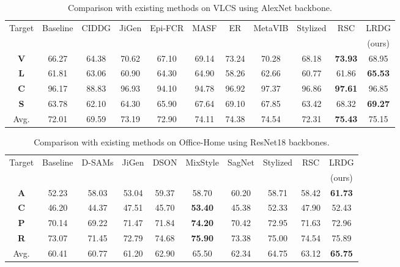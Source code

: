 \documentclass{article}
\begin{document}
\setlength{\tabcolsep}{7pt}
\begin{table}[ht]
\caption{Comparison with existing methods on VLCS using AlexNet backbone.}
\begin{center}
\scriptsize
\begin{tabular}{c|ccccccccc|c}
\hline
\multirow{2}{*}{Target} & Baseline & CIDDG & JiGen  & Epi-FCR & MASF & ER & MetaVIB & Stylized & RSC & LRDG\\
&  & \cite{li2018deep} & \cite{carlucci2019domain} & \cite{li2019episodic} & \cite{dou2019domain} & \cite{zhao2020domain} & \cite{du2020learning} & \cite{borlino2021rethinking} & \cite{huangRSC2020} & (ours) \\
\hline
\textbf{V} & 66.27 & 64.38 & 70.62 & 67.10 & 69.14 & 73.24 & 70.28 & 68.18 & \textbf{73.93} & 68.95 \\
\textbf{L} & 61.81 & 63.06 & 60.90 & 64.30 & 64.90 & 58.26 & 62.66 & 60.77 & 61.86 & \textbf{65.53} \\
\textbf{C} & 96.17 & 88.83 & 96.93 & 94.10 & 94.78 & 96.92 & 97.37 & 96.86 & \textbf{97.61} & 96.85 \\
\textbf{S} & 63.78 & 62.10 & 64.30 & 65.90 & 67.64 & 69.10 & 67.85 & 63.42 & 68.32 & \textbf{69.27} \\
Avg. & 72.01 & 69.59 & 73.19 & 72.90 & 74.11 & 74.38 & 74.54 & 72.31 & \textbf{75.43} & 75.15 \\
\hline
\end{tabular}
\end{center}
\label{tab:vlcs}
\end{table}

\setlength{\tabcolsep}{8pt}
\begin{table}[ht]
\caption{Comparison with existing methods on Office-Home using ResNet18 backbones.}
\begin{center}
\scriptsize
\begin{tabular}{c|cccccccc|c}
\hline
\multirow{2}{*}{Target} & Baseline & D-SAMs & JiGen & DSON & MixStyle & SagNet & Stylized & RSC & LRDG\\
&  & \cite{d2018domain} & \cite{carlucci2019domain} & \cite{seo2020learning} & \cite{zhou2020domain} & \cite{nam2021reducing} & \cite{borlino2021rethinking} & \cite{huangRSC2020} & (ours) \\
\hline
\textbf{A} & 52.23 & 58.03 & 53.04 & 59.37 & 58.70 & 60.20 & 58.71 & 58.42 & \textbf{61.73}\\
\textbf{C} & 46.20 & 44.37 & 47.51 & 45.70 & \textbf{53.40} & 45.38 &  52.33 & 47.90 & 52.43\\
\textbf{P} & 70.14 & 69.22 & 71.47 & 71.84 & \textbf{74.20} & 70.42 &  72.95 & 71.63 & 72.96\\
\textbf{R} & 73.07 & 71.45 & 72.79 & 74.68 & \textbf{75.90} & 73.38 &  75.00 & 74.54 & 75.89\\
Avg. & 60.41 & 60.77 & 61.20 & 62.90 & 65.50 & 62.34 & 64.75 & 63.12 & \textbf{65.75}\\
\hline
\end{tabular}
\end{center}
\label{tab:officehome}
\end{table}
\end{document}
